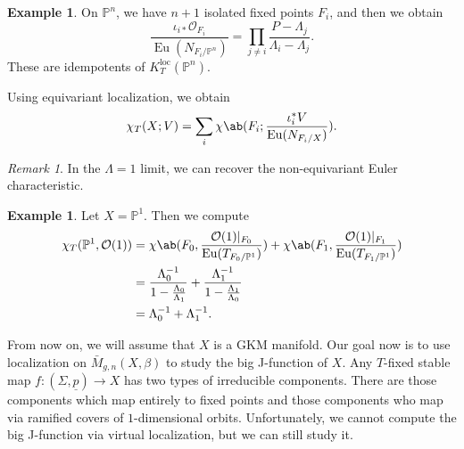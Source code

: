 \documentclass{amsart}
\theoremstyle{definition}
\newtheorem{exm}[thm]{Example}
\theoremstyle{remark}
\newtheorem{rmk}[thm]{Remark}
\theoremstyle{plain}
\theoremstyle{definition}
\theoremstyle{remark}
\renewcommand{\P}{\mathbb{P}}
\newcommand{\mc}[1]{\mathcal{#1}}
\newcommand{\mr}[1]{\mathrm{#1}}
\newcommand{\on}[1]{\operatorname{#1}}
\newcommand{\ul}[1]{\underline{#1}}
\newcommand{\1}{\mathbf{1}}
\newcommand{\2}{\mathbf{2}}
\newcommand{\3}{\mathbf{3}}
\newcommand{\loc}{\mr{loc}}
\begin{document}
\begin{exm}
    On \(\P^n\), we have \(n+1\) isolated fixed points \(F_i\), and then we obtain
    \[ \frac{\iota_{i*} \mc{O}_{F_i}}{\on{Eu}(N_{F_i/\P^n})} = \prod_{j \neq i} \frac{P - \Lambda_j}{\Lambda_i - \Lambda_j}. \]
    These are idempotents of \(K_T^{\loc}(\P^n)\).
\end{exm}

Using equivariant localization, we obtain
\[ \chi_T(X; V) = \sum_i \chi\ab(F_i; \frac{\iota_i^* V}{\on{Eu}(N_{F_i/X})}). \]

\begin{rmk}
    In the \(\Lambda = 1\) limit, we can recover the non-equivariant Euler characteristic.
\end{rmk}

\begin{exm}
    Let \(X = \P^1\). Then we compute
    \begin{align*}
        \chi_T(\P^1, \mc{O}(1)) &= \chi\ab(F_0, \frac{\mc{O}(1)|_{F_0}}{\on{Eu}(T_{F_0/\P^1})}) + \chi\ab(F_1, \frac{\mc{O}(1)|_{F_1}}{\on{Eu}(T_{F_1/\P^1})}) \\
        &= \frac{\Lambda_0^{-1}}{1 - \frac{\Lambda_0}{\Lambda_1}} + \frac{\Lambda_1^{-1}}{1 - \frac{\Lambda_1}{\Lambda_0}} \\
        &= \Lambda_0^{-1} + \Lambda_1^{-1}. 
    \end{align*}
\end{exm}

From now on, we will assume that \(X\) is a GKM manifold. Our goal now is to use localization on \(\bar{M}_{g,n}(X, \beta)\)  to study the big J-function of \(X\). Any \(T\)-fixed stable map \(f \colon (\Sigma, \ul{p}) \to X\) has two types of irreducible components. There are those components which map entirely to fixed points and those components who map via ramified covers of \(1\)-dimensional orbits. Unfortunately, we cannot compute the big J-function via virtual localization, but we can still study it.
\end{document}
